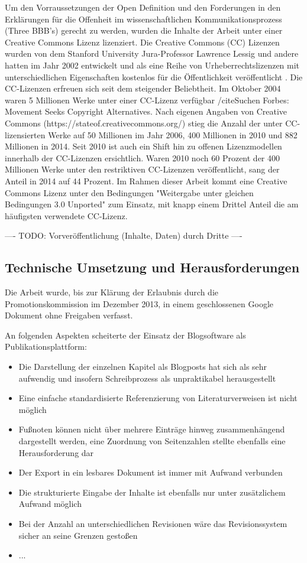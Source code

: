 Um den Vorraussetzungen der Open Definition und den Forderungen in den Erklärungen für die Offenheit im wissenschaftlichen Kommunikationsprozess (Three BBB's) gerecht zu werden, wurden die Inhalte der Arbeit unter einer Creative Commons Lizenz lizenziert. Die Creative Commons (CC) Lizenzen wurden von dem Stanford University Jura-Professor Lawrence Lessig und andere hatten im Jahr 2002 entwickelt und als eine Reihe von Urheberrechtslizenzen mit unterschiedlichen Eigenschaften kostenlos für die Öffentlichkeit veröffentlicht \cite{Minjeong_2007}. Die CC-Lizenzen erfreuen sich seit dem steigender Beliebtheit. Im Oktober 2004 waren 5 Millionen Werke unter einer CC-Lizenz verfügbar /cite{Suchen Forbes: Movement Seeks Copyright Alternatives}. Nach eigenen Angaben von Creative Commons (https://stateof.creativecommons.org/) stieg die Anzahl der unter CC-lizensierten Werke auf 50 Millionen im Jahr 2006, 400 Millionen in 2010 und 882 Millionen in 2014. Seit 2010 ist auch ein Shift hin zu offenen Lizenzmodellen innerhalb der CC-Lizenzen ersichtlich. Waren 2010 noch 60 Prozent der 400 Millionen Werke unter den restriktiven CC-Lizenzen veröffentlicht, sang der Anteil in 2014 auf 44 Prozent. Im Rahmen dieser Arbeit kommt eine Creative Commons Lizenz unter den Bedingungen "Weitergabe unter gleichen Bedingungen 3.0 Unported" zum Einsatz, mit knapp einem Drittel Anteil die am häufigsten verwendete CC-Lizenz.

---- TODO: Vorveröffentlichung (Inhalte, Daten) durch Dritte ----

\subsection{Technische Umsetzung und Herausforderungen}

Die Arbeit wurde, bis zur Klärung der Erlaubnis durch die Promotionskommission im Dezember 2013, in einem geschlossenen Google Dokument ohne Freigaben verfasst.

An folgenden Aspekten scheiterte der Einsatz der Blogsoftware als Publikationsplattform:
\begin{itemize}
\item Die Darstellung der einzelnen Kapitel als Blogposts hat sich als sehr aufwendig und insofern Schreibprozess als unpraktikabel herausgestellt
\item Eine einfache standardisierte Referenzierung von Literaturverweisen ist nicht möglich
\item Fußnoten können nicht über mehrere Einträge hinweg zusammenhängend dargestellt werden, eine Zuordnung von Seitenzahlen stellte ebenfalls eine Herausforderung dar
\item Der Export in ein lesbares Dokument ist immer mit Aufwand verbunden
\item Die strukturierte Eingabe der Inhalte ist ebenfalls nur unter zusätzlichem Aufwand möglich
\item Bei der Anzahl an unterschiedlichen Revisionen wäre das Revisionssystem sicher an seine Grenzen gestoßen
\item ...
\end{itemize}

